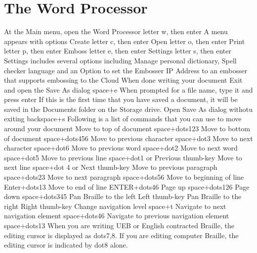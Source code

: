 \documentclass[10pt,letterpaper,twoside]{report}
\begin{document}
{{{%
\clearpage

\section{The Word Processor}
	At the Main menu, open the Word Processor \dotfill letter w, then enter
		A menu appears with options 
			Create \dotfill letter c, then enter
			Open \dotfill letter o, then enter
			Print \dotfill letter p, then enter
			Emboss \dotfill letter e, then enter
			Settings \dotfill letter s, then enter
		Settings includes several options including 
			Manage personal dictionary, 
			Spell checker language and an 
			Option to set the Embosser IP Address to an embosser that supports embossing to the Cloud
		When done writing your document
			Exit and open the Save As dialog \dotfill space+e
				When prompted for a file name, type it and press enter
				If this is the first time that you have saved a document, it will be saved in the Documents folder on the Storage drive. 
				Open Save As dialog withotu exiting \dotfill backspace+s
	Following is a list of commands that you can use to move around your document
		Move to top of document \dotfill space+dots123
		Move to bottom of document \dotfill space+dots456
		Move to previous character \dotfill space+dot3
		Move to next character \dotfill space+dot6
		Move to previous word \dotfill space+dot2
		Move to next word \dotfill space+dot5
		Move to previous line \dotfill space+dot1 or Previous thumb-key
		Move to next line \dotfill space+dot 4 or Next thumb-key
		Move to previous paragraph \dotfill space+dots23
		Move to next paragraph \dotfill space+dots56
		Move to beginning of line \dotfill Enter+dots13
		Move to end of line \dotfill ENTER+dots46
		Page up \dotfill space+dots126
		Page down \dotfill space+dots345
		Pan Braille to the left \dotfill Left thumb-key
		Pan Braille to the right \dotfill Right thumb-key
		Change navigation level \dotfill space+t 
		Navigate to next navigation element \dotfill space+dots46
		Navigate to previous navigation element \dotfill space+dots13
	When you are writing UEB or English contracted Braille, the editing cursor is displayed as dots7,8. If you are editing computer Braille, the editing cursor is indicated by dot8 alone.

}}}
\end{document}
